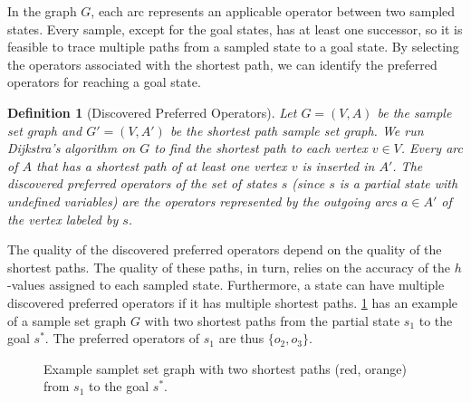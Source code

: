 \documentclass[ppgc,diss,english]{iiufrgs}
\newtheorem{definition}{Definition}
\begin{document}
In the graph $G$, each arc represents an applicable operator between two sampled states. Every sample, except for the goal states, has at least one successor, so it is feasible to trace multiple paths from a sampled state to a goal state. By selecting the operators associated with the shortest path, we can identify the preferred operators for reaching a goal state.

\begin{definition}[Discovered Preferred Operators]\label{def:discovered_preferred_operators}
Let $G = (V, A)$ be the sample set graph and $G' = (V, A')$ be the shortest path sample set graph. We run Dijkstra's algorithm on $G$ to find the shortest path to each vertex $v \in V$. Every arc of $A$ that has a shortest path of at least one vertex $v$ is inserted in $A'$. The discovered preferred operators of the set of states $s$ (since $s$ is a partial state with undefined variables) are the operators represented by the outgoing arcs $a \in A'$ of the vertex labeled by $s$.
\end{definition}

The quality of the discovered preferred operators depend on the quality of the shortest paths. The quality of these paths, in turn, relies on the accuracy of the $h$-values assigned to each sampled state.
Furthermore, a state can have multiple discovered preferred operators if it has multiple shortest paths. \cref{fig:spg-example} has an example of a sample set graph $G$ with two shortest paths from the partial state $s_{1}$ to the goal $s^{*}$. The preferred operators of $s_{1}$ are thus $\{o_{2}, o_{3}\}$.

\begin{figure}[tb]
\caption[Example sample set graph with two shortest paths]{Example samplet set graph with two shortest paths (red, orange) from $s_{1}$ to the goal $s^{*}$.}
\centering
{}
\label{fig:spg-example}
\end{figure}
\end{document}
